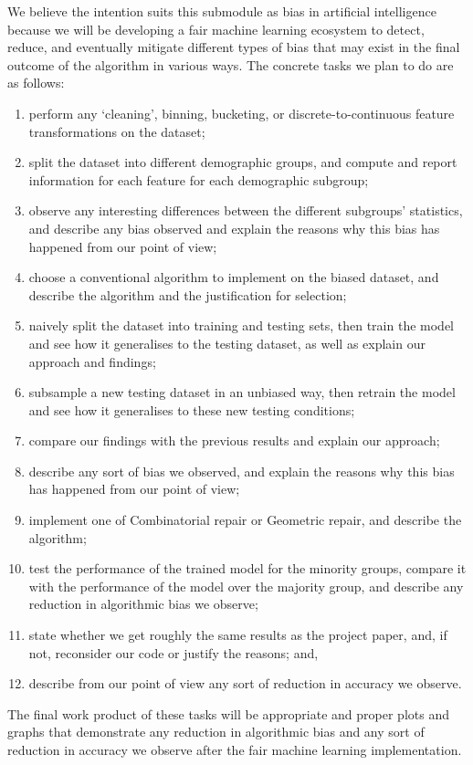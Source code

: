 \documentclass[conference]{IEEEtran}
\begin{document}
We believe the intention suits this submodule as bias in artificial intelligence because we will be developing a fair machine learning ecosystem
to detect, reduce, and eventually mitigate different types of bias that may exist in the final outcome of the algorithm in various ways. The concrete tasks we plan to do are as follows:
\begin{enumerate}
    \item perform any `cleaning', binning, bucketing, or discrete-to-continuous feature transformations on the dataset;
    \item split the dataset into different demographic groups, and compute and report information for each feature for each demographic subgroup;
    \item observe any interesting differences between the different subgroups’ statistics, and describe any bias observed and explain the reasons why this bias has happened from our point of view;
    \item choose a conventional algorithm to implement on the biased dataset, and describe the algorithm and the justification for selection;
    \item naively split the dataset into training and testing sets, then train the model and see how it generalises to the testing dataset, as well as explain our approach and findings;
    \item subsample a new testing dataset in an unbiased way, then retrain the model and see how it generalises to these new testing conditions; 
    \item compare our findings with the previous results and explain our approach;
    \item describe any sort of bias we observed, and explain the reasons why this bias has happened from our point of view;
    \item implement one of Combinatorial repair or Geometric repair, and describe the algorithm;
    \item test the performance of the trained model for the minority groups, compare it with the performance of the model over the majority group, and describe any reduction in algorithmic bias we observe;
    \item state whether we get roughly the same results as the project paper, and, if not, reconsider our code or justify the reasons; and,
    \item describe from our point of view any sort of reduction in accuracy we observe.
\end{enumerate}
The final work product of these tasks will be appropriate and proper plots and graphs that demonstrate any reduction in algorithmic bias and any sort of reduction in accuracy we observe after the fair machine learning implementation.
\end{document}
